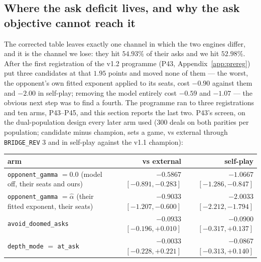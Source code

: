 \documentclass[11pt,letterpaper]{article}
\begin{document}
\subsection{Where the ask deficit lives, and why the ask objective cannot
reach it}
\label{sec:askdeficit}

The corrected table leaves exactly one channel in which the two engines
differ, and it is the channel we lose: they hit $54.93\%$ of their asks and we
hit $52.98\%$. After the first registration of the v1.2 programme (P43,
Appendix~\ref{app:prereg}) put three candidates at that $1.95$ points and
moved none of them --- the worst, the opponent's own fitted exponent applied
to its seats, cost $-0.90$ against them and $-2.00$ in self-play; removing
the model entirely cost $-0.59$ and $-1.07$ --- the obvious next step was to
find a fourth. The programme ran to three registrations and ten arms,
P43--P45, and this section reports the last two. P43's screen, on the
dual-population design every later arm used ($300$ deals on both parities per
population; candidate minus champion, sets a game, vs external through
\texttt{BRIDGE\_REV} 3 and in self-play against the v1.1 champion):

\begin{center}
\small
\begin{tabular}{>{\raggedright\arraybackslash}p{5.6cm}rr}
\toprule
arm & vs external & self-play \\
\midrule
\texttt{opponent\_gamma} $=0.0$ (model off, their seats and ours) & $-0.5867$ $[-0.891, -0.283]$ & $-1.0667$ $[-1.286, -0.847]$ \\
\texttt{opponent\_gamma} $=\hat\alpha$ (their fitted exponent, their seats) & $-0.9033$ $[-1.207, -0.600]$ & $-2.0033$ $[-2.212, -1.794]$ \\
\texttt{avoid\_doomed\_asks} & $-0.0933$ $[-0.196, +0.010]$ & $-0.0900$ $[-0.317, +0.137]$ \\
\texttt{depth\_mode} $=$ \texttt{at\_ask} & $-0.0033$ $[-0.228, +0.221]$ & $-0.0867$ $[-0.313, +0.140]$ \\
\bottomrule
\end{tabular}
\end{center}
\end{document}
